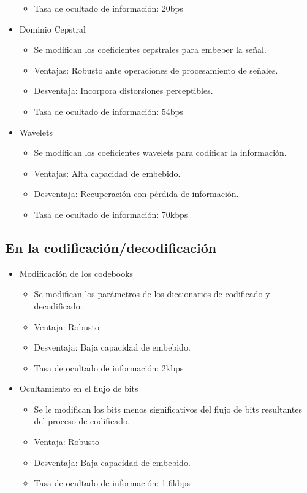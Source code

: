 \documentclass[conference,a4paper,10pt, oneside,final]{tfmpd}
\begin{document}
\begin{itemize}
\begin{itemize}
 \item Tasa de ocultado de información: 20bps
 \end{itemize}
 \item Dominio Cepstral
   \begin{itemize}
 \item Se modifican los coeficientes cepstrales para embeber la señal.
 \item Ventajas: Robusto ante operaciones de procesamiento de señales.
 \item Desventaja: Incorpora distorsiones perceptibles.
 \item Tasa de ocultado de información: 54bps
 \end{itemize}
 \item Wavelets
    \begin{itemize}
 \item Se modifican los coeficientes wavelets para codificar la información.
 \item Ventajas: Alta capacidad de embebido.
 \item Desventaja: Recuperación con pérdida de información.
 \item Tasa de ocultado de información: 70kbps
 \end{itemize}
\end{itemize}


\subsection{En la codificación/decodificación}
\begin{itemize}
 \item Modificación de los codebooks
     \begin{itemize}
 \item Se modifican los parámetros de los diccionarios de codificado y decodificado.
 \item Ventaja: Robusto
 \item Desventaja: Baja capacidad de embebido.
 \item Tasa de ocultado de información: 2kbps
 \end{itemize}
 \item Ocultamiento en el flujo de bits
      \begin{itemize}
 \item Se le modifican los bits menos significativos del flujo de bits resultantes del proceso de codificado.
 \item Ventaja: Robusto
 \item Desventaja: Baja capacidad de embebido.
 \item Tasa de ocultado de información: 1.6kbps
 \end{itemize}
\end{itemize}
\end{document}
